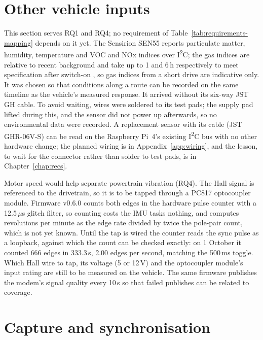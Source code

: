 \section{Other vehicle inputs}
\label{sec:impl-other}

This section serves RQ1 and RQ4; no requirement of Table~\ref{tab:requirements-mapping} depends on it yet. The Sensirion SEN55 reports particulate matter, humidity, temperature and VOC and NOx indices over I\textsuperscript{2}C; the gas indices are relative to recent background and take up to 1 and 6\,h respectively to meet specification after switch-on \cite{sensirionsen5x}, so gas indices from a short drive are indicative only. It was chosen so that conditions along a route can be recorded on the same timeline as the vehicle's measured response. It arrived without its six-way JST GH cable. To avoid waiting, wires were soldered to its test pads; the supply pad lifted during this, and the sensor did not power up afterwards, so no environmental data were recorded. A replacement sensor with its cable (JST GHR-06V-S) can be read on the Raspberry Pi~4's existing I\textsuperscript{2}C bus with no other hardware change; the planned wiring is in Appendix~\ref{app:wiring}, and the lesson, to wait for the connector rather than solder to test pads, is in Chapter~\ref{chap:recs}.

Motor speed would help separate powertrain vibration (RQ4). The Hall signal is referenced to the drivetrain, so it is to be tapped through a PC817 optocoupler module. Firmware v0.6.0 counts both edges in the hardware pulse counter with a 12.5\,$\mu$s glitch filter, so counting costs the IMU tasks nothing, and computes revolutions per minute as the edge rate divided by twice the pole-pair count, which is not yet known. Until the tap is wired the counter reads the sync pulse as a loopback, against which the count can be checked exactly: on 1 October it counted 666 edges in 333.3\,s, 2.00 edges per second, matching the 500\,ms toggle. Which Hall wire to tap, its voltage (5 or 12\,V) and the optocoupler module's input rating are still to be measured on the vehicle. The same firmware publishes the modem's signal quality every 10\,s so that failed publishes can be related to coverage.

\section{Capture and synchronisation}
\label{sec:impl-sync}

